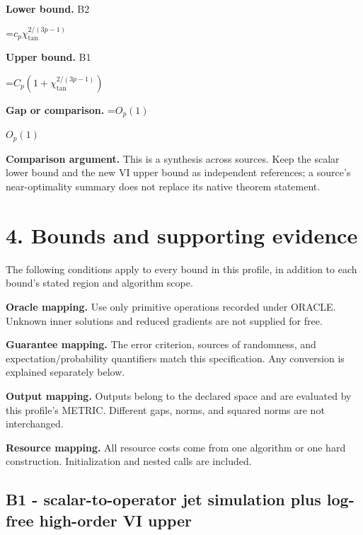 \documentclass[10pt,a4paper]{article}
\newcommand{\AtlasMath}[1]{\par\begingroup\centering\setbox0=\hbox{$\displaystyle #1$}\ifdim\wd0>1.4\linewidth\typeout{ATLAS WIDE FORMULA: \the\wd0}\fi\ifdim\wd0>\linewidth\resizebox{\linewidth}{!}{\box0}\else\box0\fi\par\endgroup}
\newcommand{\AtlasInlineMath}[1]{\begingroup\setbox0=\hbox{$#1$}\ifdim\wd0>.4\linewidth\endgroup\AtlasMath{#1}\else\endgroup$#1$\fi}
\begin{document}
\textbf{Lower bound.} B2



\AtlasMath{c_p\chi_{\mathrm{tan}}^{2/(3p-1)}}


\textbf{Upper bound.} B1



\AtlasMath{C_p(1+\chi_{\mathrm{tan}}^{2/(3p-1)})}


\textbf{Gap or comparison.} \AtlasInlineMath{O_p(1)}



\textbf{Comparison argument.} This is a synthesis across sources. Keep the scalar lower bound and the new VI upper bound as independent references; a source's near-optimality summary does not replace its native theorem statement.



\section{4. Bounds and supporting evidence}


The following conditions apply to every bound in this profile, in addition to each bound's stated region and algorithm scope.



\textbf{Oracle mapping.} Use only primitive operations recorded under ORACLE. Unknown inner solutions and reduced gradients are not supplied for free.



\textbf{Guarantee mapping.} The error criterion, sources of randomness, and expectation/probability quantifiers match this specification. Any conversion is explained separately below.



\textbf{Output mapping.} Outputs belong to the declared space and are evaluated by this profile's METRIC. Different gaps, norms, and squared norms are not interchanged.



\textbf{Resource mapping.} All resource costs come from one algorithm or one hard construction. Initialization and nested calls are included.



\subsection{B1 - scalar-to-operator jet simulation plus log-free high-order VI upper}
\end{document}
